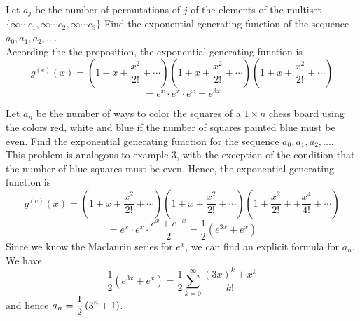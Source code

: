 \documentclass[handout]{ximera}
\begin{document}
\begin{example}[example 3]
Let $a_j$ be the number of permutations of $j$ of the elements of the multiset $\{\infty \cdots c_1, \infty \cdots c_2, \infty \cdots c_3\}$
Find the exponential generating function of the sequence $a_0, a_1, a_2, ...$.\\
According the the proposition, the exponential generating function is
\[
g^{(e)}(x) = \left(1 + x + \frac{x^2}{2!} + \cdots \right)\left(1 + x + \frac{x^2}{2!} + \cdots \right)\left(1 + x + \frac{x^2}{2!} + \cdots \right)
\]
\[
= e^x \cdot e^x \cdot e^x = e^{3x}
\]
\end{example}


\begin{example}[example 4]
Let $a_n$ be the number of ways to color the squares of a $1 \times n$ chess board using the 
colors red, white and blue if the number of squares painted blue must be even. Find the exponential generating function for the sequence $a_0 , a_1, a_2, ...$.\\
This problem is analogous to example 3, with the exception of the condition that the number of blue squares must be even.
Hence, the exponential generating function is
\[
g^{(e)}(x) = \left(1 + x + \frac{x^2}{2!} + \cdots \right)\left(1 + x + \frac{x^2}{2!} + \cdots \right)\left(1 + \frac{x^2}{2!} + + \frac{x^4}{4!} + \cdots \right)
\]
\[
= e^x \cdot e^x \cdot \frac{e^x + e^{-x}}{2} = \frac12 \left(e^{3x} + e^x \right)
\]
Since we know the Maclaurin series for $e^x$, we can find an explicit formula for $a_n$. We have
\[
\frac12 \left(e^{3x} + e^x \right) = \frac12 \sum_{k = 0}^\infty \frac{(3x)^k + x^k}{k!}
\]
and hence $a_n = \displaystyle \frac12 \left(3^n + 1\right)$.
\end{example}
\end{document}
